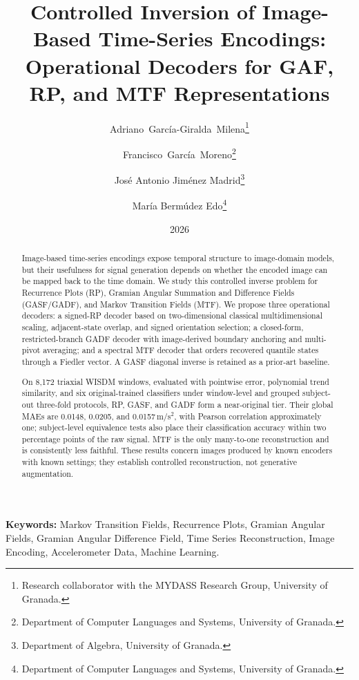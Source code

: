 \documentclass[10pt,a4paper,parskip=half-]{scrartcl}
\begin{document}
\title{Controlled Inversion of Image-Based Time-Series Encodings: Operational Decoders for GAF, RP, and MTF Representations}
\author{Adriano~García-Giralda~Milena\thanks{Research collaborator with the MYDASS Research Group, University of Granada.}
\and Francisco~García~Moreno\thanks{Department of Computer Languages and Systems, University of Granada.}
\and José Antonio Jiménez Madrid\thanks{Department of Algebra, University of Granada.}
\and
María Bermúdez Edo\thanks{Department of Computer Languages and Systems, University of Granada.}
}
\date{2026}







\maketitle
\begin{abstract}
Image-based time-series encodings expose temporal structure to image-domain models, but their usefulness for signal generation depends on whether the encoded image can be mapped back to the time domain. We study this controlled inverse problem for Recurrence Plots (RP), Gramian Angular Summation and Difference Fields (GASF/GADF), and Markov Transition Fields (MTF). We propose three operational decoders: a signed-RP decoder based on two-dimensional classical multidimensional scaling, adjacent-state overlap, and signed orientation selection; a closed-form, restricted-branch GADF decoder with image-derived boundary anchoring and multi-pivot averaging; and a spectral MTF decoder that orders recovered quantile states through a Fiedler vector. A GASF diagonal inverse is retained as a prior-art baseline.

On 8,172 triaxial WISDM windows, evaluated with pointwise error, polynomial trend similarity, and six original-trained classifiers under window-level and grouped subject-out three-fold protocols, RP, GASF, and GADF form a near-original tier. Their global MAEs are 0.0148, 0.0205, and 0.0157\,m/s$^2$, with Pearson correlation approximately one; subject-level equivalence tests also place their classification accuracy within two percentage points of the raw signal. MTF is the only many-to-one reconstruction and is consistently less faithful. These results concern images produced by known encoders with known settings; they establish controlled reconstruction, not generative augmentation.
\end{abstract}

\noindent\textbf{Keywords:}
Markov Transition Fields, Recurrence Plots, Gramian Angular Fields, Gramian Angular Difference Field, Time Series Reconstruction, Image Encoding, Accelerometer Data, Machine Learning.
\par\bigskip
\end{document}
